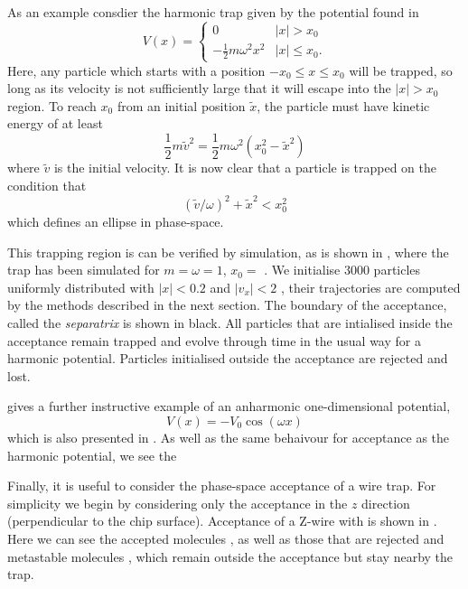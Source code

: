 As an example consdier the harmonic trap given by the potential found in
%
\begin{equation}
  V(x) = \begin{cases}
    0 & |x| > x_0 \\
    -\frac{1}{2}m\omega^2 x^2 & |x| \leq x_0.
  \end{cases}
\end{equation}
%
Here, any particle which starts with a position $-x_0 \leq x \leq x_0$ will be
trapped, so long as its velocity is not sufficiently large that it will escape
into the $|x|> x_0$ region. To reach $x_0$ from an initial position
$\tilde{x}$, the particle must have kinetic energy of at least
%
\begin{equation}
  \frac{1}{2}m\tilde{v}^2 = \frac{1}{2}m\omega^2(x_0^2 - \tilde{x}^2)
\end{equation}
%
where $\tilde{v}$ is the initial velocity. It is now clear that a particle is
trapped on the condition that
%
\begin{equation}
  (\tilde{v}/\omega)^2 + \tilde{x}^2 < x_0^2
\end{equation}
%
which defines an ellipse in phase-space.

This trapping region is can be verified by simulation, as is shown in
, where the trap has been simulated for $m =
\omega = 1$, $x_0 =$ . We initialise 3000 particles uniformly distributed
with $|x| < 0.2$ and $|v_x|<2$ , their trajectories are computed by
the methods described in the next section. The boundary of the acceptance,
called the \emph{separatrix} is shown in black. All particles that are
intialised inside the acceptance remain trapped and evolve through time in the
usual way for a harmonic potential. Particles initialised outside the
acceptance are rejected and lost.

 gives a further instructive example of an anharmonic
one-dimensional potential,
%
\begin{equation}
  V(x) = -V_0\cos(\omega x)
\end{equation}
%
which is also presented in . As well as the same
behaivour for acceptance as the harmonic potential, we see the

Finally, it is useful to consider the phase-space acceptance of a wire trap.
For simplicity we begin by considering only the acceptance in the $z$ direction
(perpendicular to the chip surface). Acceptance of a Z-wire with 
is shown in . Here we can see the accepted
molecules , as well as those that are rejected  and
metastable molecules , which remain outside the acceptance but stay
nearby the trap. 

